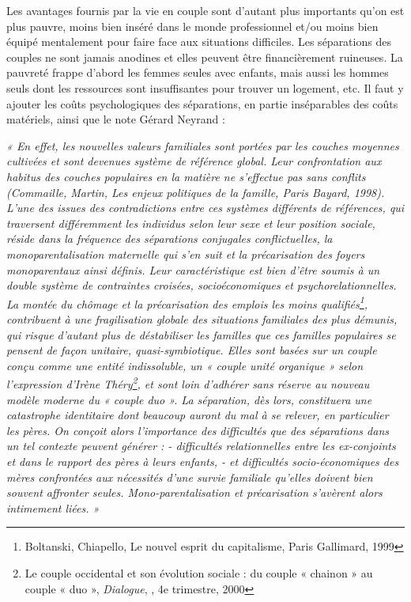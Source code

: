 {Les avantages fournis par la vie en couple sont d'autant plus importants qu'on est plus pauvre, moins bien inséré dans le monde professionnel et/ou moins bien équipé mentalement pour faire face aux situations difficiles. Les séparations des couples ne sont jamais anodines et elles peuvent être financièrement ruineuses. La pauvreté frappe d'abord les femmes seules avec enfants, mais aussi les hommes seuls dont les ressources sont insuffisantes pour trouver un logement, etc. Il faut y ajouter les coûts psychologiques des séparations, en partie inséparables des coûts matériels, ainsi que le note Gérard Neyrand  :  
\begin{displayquote}
\emph{« En effet, les nouvelles valeurs familiales sont portées par les couches moyennes cultivées et sont devenues système de référence global. Leur confrontation aux habitus des couches populaires en la matière ne s'effectue pas sans conflits (Commaille, Martin, Les enjeux politiques de la famille, Paris Bayard, 1998). L'une des issues des contradictions entre ces systèmes différents de références, qui traversent différemment les individus selon leur sexe et leur position sociale, réside dans la fréquence des séparations conjugales conflictuelles, la monoparentalisation maternelle qui s'en suit et la précarisation des foyers monoparentaux ainsi définis. Leur caractéristique est bien d'être soumis à un double système de contraintes croisées, socioéconomiques et psychorelationnelles.
La montée du chômage et la précarisation des emplois les moins qualifiés\footnote{ Boltanski, Chiapello, Le nouvel esprit du capitalisme, Paris Gallimard, 1999}, contribuent à une fragilisation globale des situations familiales des plus démunis, qui risque d'autant plus de déstabiliser les familles que ces familles populaires se pensent de façon unitaire, quasi-symbiotique.
Elles sont basées sur un couple conçu comme une entité indissoluble, un « couple unité organique » selon l'expression d'Irène Théry\footnote{Le couple occidental et son évolution sociale : du couple « chainon » au couple « duo », \emph{Dialogue}, , 4e trimestre, 2000}, et sont loin d'adhérer sans réserve au nouveau modèle moderne du « couple duo ». La séparation, dès lors, constituera une catastrophe identitaire dont beaucoup auront du mal à se relever, en particulier les pères.
On conçoit alors l'importance des difficultés que des séparations dans un tel contexte peuvent générer :
- difficultés relationnelles entre les ex-conjoints et dans le rapport des pères à leurs enfants,
- et difficultés socio-économiques des mères confrontées aux nécessités d'une survie familiale qu'elles doivent bien souvent affronter seules.
Mono-parentalisation et précarisation s'avèrent alors intimement liées. »}
\end{displayquote}


}

